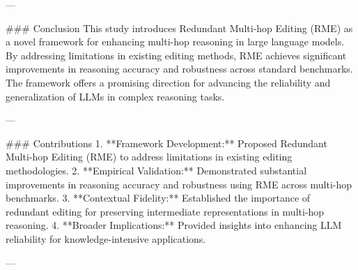 ---

### Conclusion  
This study introduces Redundant Multi-hop Editing (RME) as a novel framework for enhancing multi-hop reasoning in large language models. By addressing limitations in existing editing methods, RME achieves significant improvements in reasoning accuracy and robustness across standard benchmarks. The framework offers a promising direction for advancing the reliability and generalization of LLMs in complex reasoning tasks.

---

### Contributions  
1. **Framework Development:** Proposed Redundant Multi-hop Editing (RME) to address limitations in existing editing methodologies.  
2. **Empirical Validation:** Demonstrated substantial improvements in reasoning accuracy and robustness using RME across multi-hop benchmarks.  
3. **Contextual Fidelity:** Established the importance of redundant editing for preserving intermediate representations in multi-hop reasoning.  
4. **Broader Implications:** Provided insights into enhancing LLM reliability for knowledge-intensive applications.

---